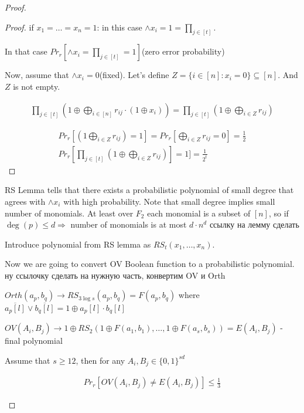 \begin{proof}
\begin{lm}
		\begin{proof}
			if $x_1 = \dots = x_n = 1$: in this case $\land x_i = 1 = \prod_{j \in [t]}$.

			In that case $Pr_r[\land x_i = \prod_{j \in [t]} = 1]$(zero error probability)

			Now, assume that $\land x_i = 0$(fixed).
			Let's define $Z = \{ i \in [n]: x_i = 0 \} \subseteq [n]$.
			And $Z$ is not empty.

			\begin{align*}
				\prod_{j \in [t]}\left(1 \oplus \bigoplus_{i \in [n]} r_{i j} \cdot (1 \oplus x_i)\right)= \prod_{j \in [t]}(1 \oplus \bigoplus_{i \in Z} r_{i j})
			\end{align*}

			\begin{align*}
				Pr_r[(1 \bigoplus_{i \in Z} r_{i j}) = 1] = Pr_r[\bigoplus_{i \in Z} r_{i j} = 0] = \frac{1}{2}\\
				Pr_r[\prod_{j \in [t]}(1 \oplus \bigoplus_{i \in Z}r_{i j})] = 1]=\frac{1}{2^{t}}
			\end{align*}
		\end{proof}

		RS Lemma tells that there exists a probabilistic polynomial of small degree that agrees with $\land x_i$ with high probability. Note that small degree implies small number of monomials.
		At least over $F_2$ each monomial is a subset of $[n]$, so if $\deg(p) \leq d \Rightarrow$ number of monomials is at most $d \cdot n^{d}$     {\color{red} ссылку на лемму сделать}

		Introduce polynomial from RS lemma as $RS_t(x_1, \dots, x_n)$.

		Now we are going to convert OV Boolean function to a probabilistic polynomial.
		{\color{red} ну ссылочку сделать на нужную часть, конвертим OV и Orth}

		$Orth(a_p, b_q) \to RS_{3 \log s}(a_p, b_q) = F(a_p, b_q)$ where $\overline{a_p[l]} \lor \overline{b_q[l]} = 1 \oplus a_p[l] \cdot b_q[l]$

		$OV(A_i, B_j) \to 1 \oplus RS_2(1 \oplus F(a_1, b_1), \dots, 1 \oplus F(a_s, b_s)) = E(A_i, B_j)$ - final polynomial

		\begin{lm}

			Assume that $s \geq 12$, then for any $A_i, B_j \in \{0, 1\}^{sd}$

			\begin{align*}
				Pr_r[OV(A_i, B_j) \neq E(A_i, B_j)] \leq \frac{1}{3}
			\end{align*}


\end{lm}
\end{lm}
\end{proof}
